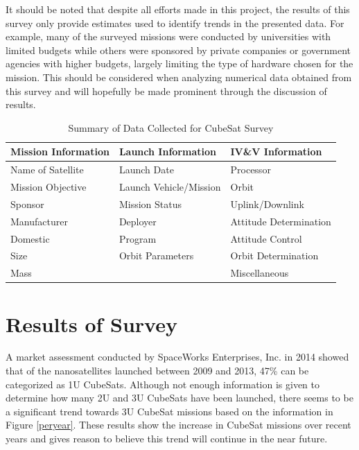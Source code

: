 \documentclass[11pt]{article}
\begin{document}
It should be noted that despite all efforts made in this project, the results of this survey only provide estimates used to identify trends in the presented data.  For example, many of the surveyed missions were conducted by universities with limited budgets while others were sponsored by private companies or government agencies with higher budgets, largely limiting the type of hardware chosen for the mission.  This should be considered when analyzing numerical data obtained from this survey and will hopefully be made prominent through the discussion of results. 
\begin{table}[h]
\centering
\caption{Summary of Data Collected for CubeSat Survey}
\label{summary}
\begin{tabular}{|l|l|l|}
\hline
\textbf{Mission Information} & \textbf{Launch Information} & \textbf{IV\&V Information} \\ \hline
Name of Satellite & Launch Date & Processor \\ \hline
Mission Objective & Launch Vehicle/Mission & Orbit \\ \hline
Sponsor & Mission Status & Uplink/Downlink \\ \hline
Manufacturer & Deployer & Attitude Determination \\ \hline
Domestic & Program & Attitude Control \\ \hline
Size & Orbit Parameters & Orbit Determination \\ \hline
Mass &  & Miscellaneous \\ \hline
\end{tabular}
\end{table}

\section{Results of Survey}
A market assessment conducted by SpaceWorks Enterprises, Inc. in 2014 showed that of the nanosatellites launched between 2009 and 2013, 47\% can be categorized as 1U CubeSats.  Although not enough information is given to determine how many 2U and 3U CubeSats have been launched, there seems to be a significant trend towards 3U CubeSat missions based on the information in Figure \ref{peryear}.  These results show the increase in CubeSat missions over recent years and gives reason to believe this trend will continue in the near future.
\end{document}
